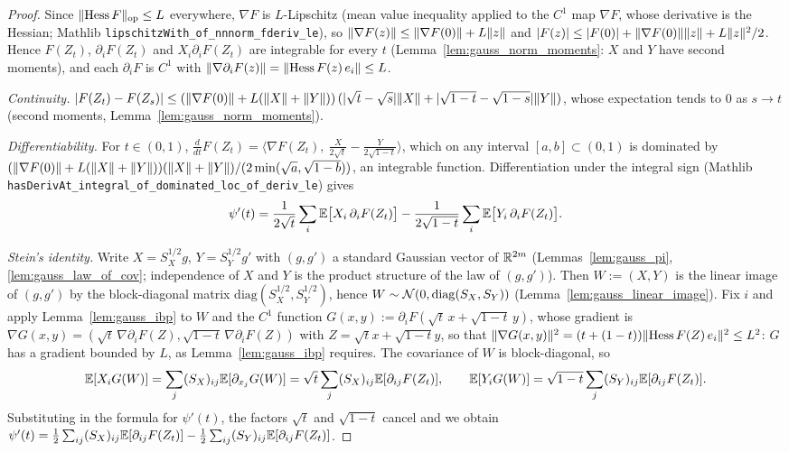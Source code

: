 \begin{proof}
\leanok
{}
Since $\lVert \mathrm{Hess}\,F \rVert_{\mathrm{op}}\le L$ everywhere, $\nabla F$ is $L$-Lipschitz
(mean value inequality applied to the $C^1$ map $\nabla F$, whose derivative is the Hessian;
Mathlib \texttt{lipschitzWith\_of\_nnnorm\_fderiv\_le}), so
$\lVert \nabla F(z) \rVert \le \lVert \nabla F(0) \rVert + L\lVert z \rVert$ and $\lvert F(z) \rvert \le \lvert F(0) \rvert + \lVert \nabla F(0) \rVert\lVert z \rVert + L\lVert z \rVert^2/2$.
Hence $F(Z_t)$, $\partial_iF(Z_t)$ and $X_i\partial_iF(Z_t)$ are integrable for every $t$
(Lemma~\ref{lem:gauss_norm_moments}: $X$ and $Y$ have second moments), and each
$\partial_iF$ is $C^1$ with $\lVert \nabla\partial_iF(z) \rVert = \lVert \mathrm{Hess}\,F(z)\,e_i \rVert\le L$.

\emph{Continuity.} $\lvert F(Z_t) - F(Z_s) \rvert \le (\lVert \nabla F(0) \rVert + L(\lVert X \rVert+\lVert Y \rVert))\,(\lvert \sqrt t-\sqrt s \rvert\lVert X \rVert + \lvert \sqrt{1-t}-\sqrt{1-s} \rvert\lVert Y \rVert)$,
whose expectation tends to $0$ as $s\to t$ (second moments, Lemma~\ref{lem:gauss_norm_moments}).

\emph{Differentiability.} For $t \in (0,1)$, $\frac{d}{dt}F(Z_t) = \big\langle\nabla F(Z_t),\ \tfrac{X}{2\sqrt t} - \tfrac{Y}{2\sqrt{1-t}}\big\rangle$,
which on any interval $[a,b]\subset(0,1)$ is dominated by
$(\lVert \nabla F(0) \rVert + L(\lVert X \rVert+\lVert Y \rVert))(\lVert X \rVert+\lVert Y \rVert)/(2\min(\sqrt a,\sqrt{1-b}))$, an
integrable function. Differentiation under the integral sign (Mathlib
\texttt{hasDerivAt\_integral\_of\_dominated\_loc\_of\_deriv\_le}) gives
\[
  \psi'(t) = \frac{1}{2\sqrt t}\sum_i\mathbb{E}\big[X_i\,\partial_iF(Z_t)\big]
  - \frac{1}{2\sqrt{1-t}}\sum_i\mathbb{E}\big[Y_i\,\partial_iF(Z_t)\big].
\]

\emph{Stein's identity.} Write $X = S_X^{1/2}g$, $Y = S_Y^{1/2}g'$ with $(g,g')$ a standard
Gaussian vector of $\mathbb{R}^{2m}$ (Lemmas~\ref{lem:gauss_pi}, \ref{lem:gauss_law_of_cov}; independence
of $X$ and $Y$ is the product structure of the law of $(g,g')$). Then $W := (X,Y)$ is the linear
image of $(g,g')$ by the block-diagonal matrix $\mathrm{diag}(S_X^{1/2},S_Y^{1/2})$, hence
$W\sim\mathcal{N}(0,\mathrm{diag}(S_X,S_Y))$ (Lemma~\ref{lem:gauss_linear_image}). Fix $i$ and apply
Lemma~\ref{lem:gauss_ibp} to $W$ and the $C^1$ function
$G(x,y) := \partial_iF(\sqrt t\,x + \sqrt{1-t}\,y)$, whose gradient is
$\nabla G(x,y) = (\sqrt t\,\nabla\partial_iF(Z), \sqrt{1-t}\,\nabla\partial_iF(Z))$ with
$Z = \sqrt t x+\sqrt{1-t}y$, so that
$\lVert \nabla G(x,y) \rVert^2 = (t + (1-t))\lVert \mathrm{Hess}\,F(Z)\,e_i \rVert^2\le L^2$: $G$ has a
gradient bounded by $L$, as Lemma~\ref{lem:gauss_ibp} requires.
The covariance of $W$ is block-diagonal, so
\[
  \mathbb{E}[X_iG(W)] = \sum_j (S_X)_{ij}\mathbb{E}[\partial_{x_j}G(W)] = \sqrt t\sum_j(S_X)_{ij}\mathbb{E}[\partial_{ij}F(Z_t)],
  \qquad
  \mathbb{E}[Y_iG(W)] = \sqrt{1-t}\sum_j(S_Y)_{ij}\mathbb{E}[\partial_{ij}F(Z_t)].
\]
Substituting in the formula for $\psi'(t)$, the factors $\sqrt t$ and $\sqrt{1-t}$ cancel and
we obtain $\psi'(t) = \frac12\sum_{ij}(S_X)_{ij}\mathbb{E}[\partial_{ij}F(Z_t)] - \frac12\sum_{ij}(S_Y)_{ij}\mathbb{E}[\partial_{ij}F(Z_t)]$.
\end{proof}

